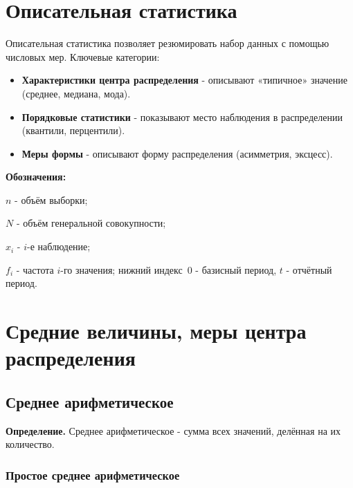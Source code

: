 \documentclass[a4paper]{article}
\begin{document}
	
	
\tableofcontents

\section{Описательная статистика}

Описательная статистика позволяет резюмировать набор данных с помощью числовых мер.
Ключевые категории:

\begin{itemize}[noitemsep]
	\item \textbf{Характеристики центра распределения} - описывают «типичное» значение
	(среднее, медиана, мода).
	\item \textbf{Порядковые статистики} - показывают место наблюдения в распределении
	(квантили, перцентили).
	\item \textbf{Меры формы} - описывают форму распределения
	(асимметрия, эксцесс).
\end{itemize}

\noindent\textbf{Обозначения:} 

\textbf{$n$ }- объём выборки; 

\textbf{$N$} - объём генеральной
совокупности; 

\textbf{$x_i$} - $i$-е наблюдение; 

\textbf{$f_i$} - частота $i$-го значения; нижний индекс~$0$ - базисный период, $t$ - отчётный период.


\section{Средние величины, меры центра распределения}

\subsection{Среднее арифметическое}


	\textbf{Определение.} Среднее арифметическое - сумма всех значений, делённая
	на их количество.


\subsubsection{Простое среднее арифметическое}
\end{document}
